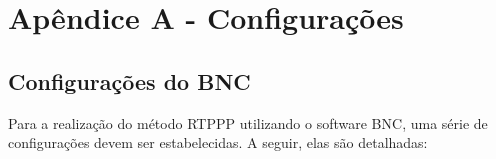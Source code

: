 %
%
% 
%


\chapter{Apêndice A - Configurações}
\noindent

\section{Configurações do BNC}
\label{bnc_config}

Para a realização do método RTPPP utilizando o software BNC, uma série de configurações devem ser estabelecidas. A seguir, elas são detalhadas:

